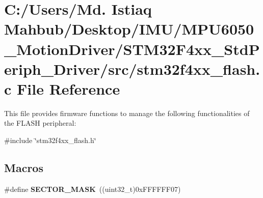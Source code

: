 \section{C\+:/\+Users/\+Md. Istiaq Mahbub/\+Desktop/\+I\+M\+U/\+M\+P\+U6050\+\_\+\+Motion\+Driver/\+S\+T\+M32\+F4xx\+\_\+\+Std\+Periph\+\_\+\+Driver/src/stm32f4xx\+\_\+flash.c File Reference}
\label{stm32f4xx__flash_8c}


This file provides firmware functions to manage the following functionalities of the F\+L\+A\+SH peripheral\+:  


{\ttfamily \#include \char`\"{}stm32f4xx\+\_\+flash.\+h\char`\"{}}\newline
\subsection*{Macros}
\begin{DoxyCompactItemize}
\item 
\#define \textbf{ S\+E\+C\+T\+O\+R\+\_\+\+M\+A\+SK}~((uint32\+\_\+t)0x\+F\+F\+F\+F\+F\+F07)
\end{DoxyCompactItemize}
